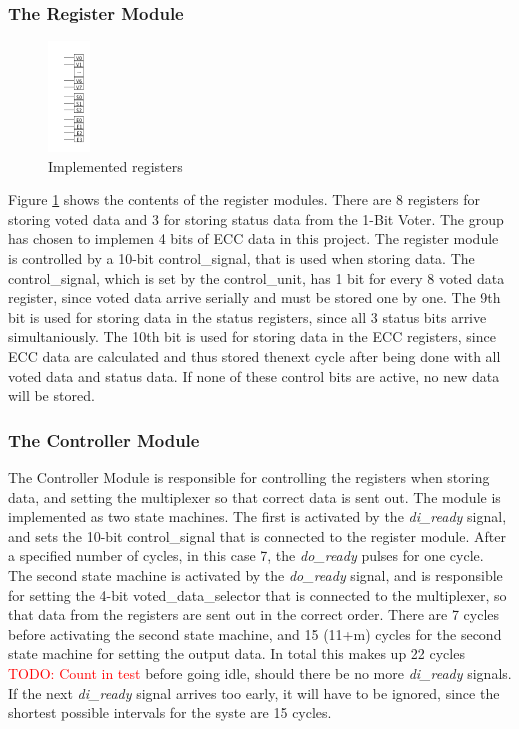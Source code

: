 \documentclass[a4paper]{IEEEtran}
\newcommand\TODO[1]{\textcolor{red}{TODO:#1}}
\newcommand\todo[1]{\TODO{#1}}
\begin{document}
\subsubsection{The Register Module}
\begin{figure}[h!]
    \centering
    \includegraphics[width=0.10\textwidth]{Figures/Solution/Registers}
    \caption{Implemented registers}
    \label{fig:Registers}
\end{figure}
Figure \ref{fig:Registers} shows the contents of the register modules.
There are 8 registers for storing voted data and 3 for storing status data from the 1-Bit Voter.
The group has chosen to implemen 4 bits of ECC data in this project.
The register module is controlled by a 10-bit control\_signal, that is used when storing data.
The control\_signal, which is set by the control\_unit, has 1 bit for every 8 voted data register, since voted data arrive serially and must be stored one by one.
The 9th bit is used for storing data in the status registers, since all 3 status bits arrive simultaniously.
The 10th bit is used for storing data in the ECC registers, since ECC data are calculated and thus stored thenext  cycle after being done with all voted data and status data.
If none of these control bits are active, no new data will be stored.

\subsubsection{The Controller Module}
The Controller Module is responsible for controlling the registers when storing data, and setting the multiplexer so that correct data is sent out.
The module is implemented as two state machines.
The first is activated by the \textit{di\_ready} signal, and sets the 10-bit control\_signal that is connected to the register module.
After a specified number of cycles, in this case 7, the \textit{do\_ready} pulses for one cycle.
The second state machine is activated by the \textit{do\_ready} signal, and is responsible for setting the 4-bit voted\_data\_selector that is connected to the multiplexer, so that data from the registers are sent out in the correct order.
There are 7 cycles before activating the second state machine, and 15 (11+m) cycles for the second state machine for setting the output data. 
In total this makes up 22 cycles \todo{ Count in test} before going idle, should there be no more \textit{di\_ready} signals.
If the next \textit{di\_ready} signal arrives too early, it will have to be ignored, since the shortest possible intervals for the syste are 15 cycles.
\end{document}
